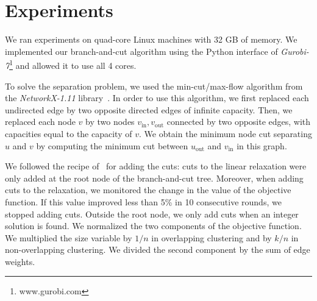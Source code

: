 \documentclass[conference]{IEEEtran}
\begin{document}
\section{Experiments}
\label{sec:experiments}
%
%
%
%
We ran experiments on quad-core Linux machines with 32 GB of memory. We implemented our branch-and-cut algorithm using the Python interface
of \emph{Gurobi-7}\footnote{www.gurobi.com} and allowed it to use all 4 cores.

To solve the separation problem, we used the min-cut/max-flow algorithm from the \emph{NetworkX-1.11} library~\cite{NetworkX}. In order to use this algorithm, we first replaced
each undirected edge by two opposite directed edges of infinite capacity.
Then, we replaced each node $v$ by two nodes $v_{\text{in}}, v_{\text{out}}$ connected by two opposite
edges, with capacities equal to the capacity of $v$. We obtain the
minimum node cut separating $u$ and $v$ by computing the minimum cut
between $u_{\text{out}}$ and $v_{\text{in}}$ in this graph.

We followed the recipe of~\cite{CarvajalCGVW13} for adding the cuts: cuts to the
linear relaxation were only added at the root node of the branch-and-cut tree.
Moreover, when adding cuts to the relaxation, we monitored the change in
the value of the objective function. If this value improved less than 5\% in 10 consecutive rounds, we stopped adding cuts. Outside the root node, we only add cuts when an integer solution is found. We normalized the two components of the objective function. We multiplied the size variable by $1/n$ in overlapping clustering and by $k/n$ in non-overlapping clustering. We divided the second component by the sum of edge weights.
\end{document}
